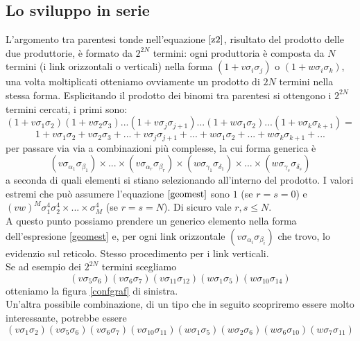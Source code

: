 \documentclass[11pt]{article}
\begin{document}
\subsection{Lo sviluppo in serie}
L'argomento tra parentesi tonde nell'equazione $\ref{z2}$, risultato del prodotto delle due produttorie, è formato da $2^{2N}$ termini: ogni produttoria è composta da $N$ termini (i link orizzontali o verticali) nella forma $(1+v\sigma_i\sigma_j)$ o $(1+w\sigma_i\sigma_k)$, una volta moltiplicati otteniamo ovviamente un prodotto di $2N$ termini nella stessa forma. Esplicitando il prodotto dei binomi tra parentesi si ottengono i $2^{2N}$ termini cercati, i primi sono:
$$
(1+v\sigma_{1}\sigma_{2})(1+v\sigma_{2}\sigma_{3})...(1+v\sigma_{j}\sigma_{j+1})...(1+w\sigma_{1}\sigma_{2})...(1+v\sigma_{k}\sigma_{k+1})=
$$
$$
1+v\sigma_{1}\sigma_{2}+v\sigma_{2}\sigma_{3}+...+v\sigma_{j}\sigma_{j+1}+...+w\sigma_{1}\sigma_{2}+...+w\sigma_{k}\sigma_{k+1}+...
$$
per passare via via a combinazioni più complesse, la cui forma generica è
\begin{equation}\label{geomest}
(v\sigma_{\alpha_1}\sigma_{\beta_1})\times... \times (v\sigma_{\alpha_r}\sigma_{\beta_r})\times (w\sigma_{\gamma_1}\sigma_{\delta_1}) \times... \times (w\sigma_{\gamma_s}\sigma_{\delta_s})
\end{equation}
a seconda di quali elementi si stiano selezionando all'interno del prodotto. I valori estremi che può assumere l'equazione $\ref{geomest}$ sono $1$ (se $r=s=0$) e $(vw)^M\sigma_1^4\sigma_2^4\times...\times\sigma_M^4$ (se $r=s=N$). Di sicuro vale $r,s \le N$. \\
 A questo punto possiamo prendere un generico elemento nella forma dell'espresione \ref{geomest} e, per ogni link orizzontale $(v\sigma_{\alpha_i}\sigma_{\beta_i})$ che trovo, lo evidenzio sul reticolo. Stesso procedimento per i link verticali.\\
 Se ad esempio dei $2^{2N}$ termini scegliamo
 \begin{equation}\label{esempioprod}
 (v\sigma_{5}\sigma_{6})(v\sigma_{6}\sigma_{7})(v\sigma_{11}\sigma_{12})(w\sigma_{1}\sigma_{5})(w\sigma_{10}\sigma_{14})
 \end{equation}
 otteniamo la figura \ref{confgraf} di sinistra. \\Un'altra possibile combinazione, di un tipo che in seguito scopriremo essere molto interessante, potrebbe essere
\begin{equation}\label{esempioprodchiuso}
(v\sigma_{1}\sigma_{2})(v\sigma_{5}\sigma_{6})(v\sigma_{6}\sigma_{7})(v\sigma_{10}\sigma_{11})(w\sigma_{1}\sigma_{5})(w\sigma_{2}\sigma_{6})(w\sigma_{6}\sigma_{10})(w\sigma_{7}\sigma_{11})
\end{equation}
\end{document}
